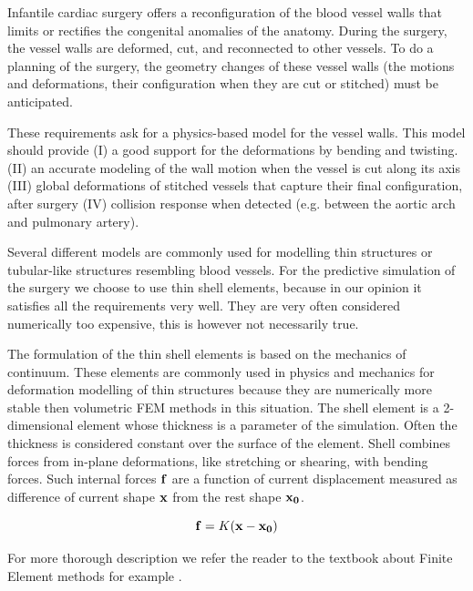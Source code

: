 Infantile cardiac surgery offers a reconfiguration of the blood vessel walls that limits or rectifies the congenital anomalies of the anatomy.
During the surgery, the vessel walls are deformed, cut, and reconnected to other vessels.
To do a planning of the surgery, the geometry changes of these vessel walls (the motions and deformations, their configuration when they are cut or stitched)  must be anticipated.

These requirements ask for a physics-based model for the vessel walls. This model should provide (I) a good support for the deformations by bending and twisting. (II) an accurate modeling of the wall motion when the vessel is cut along its axis (III) global deformations of stitched vessels that capture their final configuration, after surgery (IV) collision response when detected (e.g. between the aortic arch and pulmonary artery). 

Several different models are commonly used for modelling thin structures or
tubular-like structures resembling blood vessels.  For the predictive simulation of the surgery we choose to use
thin shell elements, because in our opinion it satisfies all the
requirements very well. They are very often considered numerically too
expensive, this is however not necessarily true.


The formulation of the thin shell elements is based on the mechanics of
continuum. These elements are commonly used in physics and mechanics for
deformation modelling of thin structures because they are numerically more
stable then volumetric FEM methods in this situation. The shell element is
a 2-dimensional element whose thickness is a parameter of the simulation.
Often the thickness is considered constant over the surface of the element.
Shell combines forces from in-plane deformations, like stretching or shearing, with bending forces. 
Such internal forces $\mathbf{f}$ are a function of current displacement measured as difference of current shape
$\mathbf{x}$ from the rest shape $\mathbf{x_0}$.

\begin{equation}
  \mathbf{f} = K(\mathbf{x} - \mathbf{x_0})
 \label{linear_static_model} 
\end{equation}

For more thorough description we refer the reader to the textbook about
Finite Element methods for example \cite{Reddy1993}.

